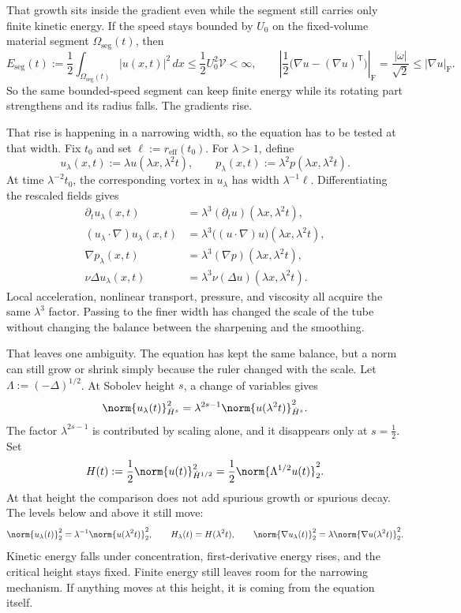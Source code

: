 That growth sits inside the gradient even while the segment still carries only finite kinetic energy. If the speed stays bounded by \(U_0\) on the fixed-volume material segment \(\Omega_{\mathrm{seg}}(t)\), then
\[
  E_{\mathrm{seg}}(t)
  :=
  \frac12\int_{\Omega_{\mathrm{seg}}(t)}|u(x,t)|^2\,dx
  \leq
  \frac12U_0^2\mathcal V
  <
  \infty,
  \qquad
  \left|\frac12\bigl(\nabla u-(\nabla u)^{\mathsf T}\bigr)\right|_{\mathrm F}
  =
  \frac{|\omega|}{\sqrt2}
  \leq
  |\nabla u|_{\mathrm F}.
\]
So the same bounded-speed segment can keep finite energy while its rotating part strengthens and its radius falls. The gradients rise.


That rise is happening in a narrowing width, so the equation has to be tested at that width. Fix \(t_0\) and set \(\ell:=r_{\mathrm{eff}}(t_0)\). For \(\lambda>1\), define
\[
  u_\lambda(x,t)
  :=
  \lambda u(\lambda x,\lambda^2t),
  \qquad
  p_\lambda(x,t)
  :=
  \lambda^2p(\lambda x,\lambda^2t).
\]
At time \(\lambda^{-2}t_0\), the corresponding vortex in \(u_\lambda\) has width \(\lambda^{-1}\ell\). Differentiating the rescaled fields gives
\[
\begin{aligned}
  \partial_tu_\lambda(x,t)
  &=
  \lambda^3(\partial_tu)(\lambda x,\lambda^2t),
  \\
  (u_\lambda\cdot\nabla)u_\lambda(x,t)
  &=
  \lambda^3\bigl((u\cdot\nabla)u\bigr)(\lambda x,\lambda^2t),
  \\
  \nabla p_\lambda(x,t)
  &=
  \lambda^3(\nabla p)(\lambda x,\lambda^2t),
  \\
  \nu\Delta u_\lambda(x,t)
  &=
  \lambda^3\nu(\Delta u)(\lambda x,\lambda^2t).
\end{aligned}
\]
Local acceleration, nonlinear transport, pressure, and viscosity all acquire the same \(\lambda^3\) factor. Passing to the finer width has changed the scale of the tube without changing the balance between the sharpening and the smoothing.


That leaves one ambiguity. The equation has kept the same balance, but a norm can still grow or shrink simply because the ruler changed with the scale. Let \(\Lambda:=(-\Delta)^{1/2}\). At Sobolev height \(s\), a change of variables gives
\[
  \norm{u_\lambda(t)}_{\dot H^s}^2
  =
  \lambda^{2s-1}
  \norm{u(\lambda^2t)}_{\dot H^s}^2.
\]
The factor \(\lambda^{2s-1}\) is contributed by scaling alone, and it disappears only at \(s=\tfrac12\). Set
\[
  H(t)
  :=
  \frac12\norm{u(t)}_{\dot H^{1/2}}^2
  =
  \frac12\norm{\Lambda^{1/2}u(t)}_2^2.
\]
At that height the comparison does not add spurious growth or spurious decay. The levels below and above it still move:
\[
  \norm{u_\lambda(t)}_2^2
  =
  \lambda^{-1}\norm{u(\lambda^2t)}_2^2,
  \qquad
  H_\lambda(t)=H(\lambda^2t),
  \qquad
  \norm{\nabla u_\lambda(t)}_2^2
  =
  \lambda\norm{\nabla u(\lambda^2t)}_2^2.
\]
Kinetic energy falls under concentration, first-derivative energy rises, and the critical height stays fixed. Finite energy still leaves room for the narrowing mechanism. If anything moves at this height, it is coming from the equation itself.

